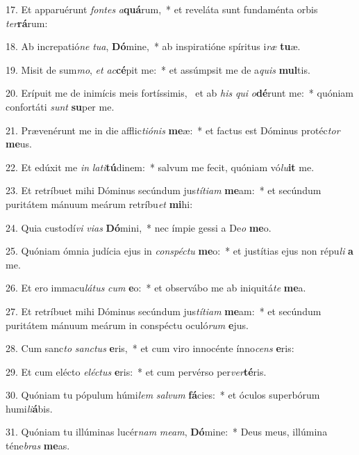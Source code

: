 17. Et apparuérunt \textit{fon}\textit{tes} \textit{a}\textbf{quá}rum,~*  et reveláta sunt fundaménta orbis \textit{ter}\textbf{rá}rum:\

18. Ab increpatió\textit{ne} \textit{tu}\textit{a}, \textbf{Dó}mine,~*  ab inspiratióne spíritus i\textit{ræ} \textbf{tu}æ.\

19. Misit de sum\textit{mo}, \textit{et} \textit{ac}\textbf{cé}pit me:~*  et assúmpsit me de a\textit{quis} \textbf{mul}tis.\

20. Erípuit me de inimícis meis fortíssimis, \dag\  et ab \textit{his} \textit{qui} \textit{o}\textbf{dé}runt me:~*  quóniam confortáti \textit{sunt} \textbf{su}per me.\

21. Prævenérunt me in die afflic\textit{ti}\textit{ó}\textit{nis} \textbf{me}æ:~*  et factus est Dóminus protéc\textit{tor} \textbf{me}us.\

22. Et edúxit me \textit{in} \textit{la}\textit{ti}\textbf{tú}dinem:~*  salvum me fecit, quóniam vó\textit{lu}\textbf{it} me.\

23. Et retríbuet mihi Dóminus secúndum jus\textit{tí}\textit{ti}\textit{am} \textbf{me}am:~*  et secúndum puritátem mánuum meárum retríbu\textit{et} \textbf{mi}hi:\

24. Quia custodí\textit{vi} \textit{vi}\textit{as} \textbf{Dó}mini,~*  nec ímpie gessi a De\textit{o} \textbf{me}o.\

25. Quóniam ómnia judícia ejus in \textit{con}\textit{spéc}\textit{tu} \textbf{me}o:~*  et justítias ejus non répu\textit{li} \textbf{a} me.\

26. Et ero immacu\textit{lá}\textit{tus} \textit{cum} \textbf{e}o:~*  et observábo me ab iniquitá\textit{te} \textbf{me}a.\

27. Et retríbuet mihi Dóminus secúndum jus\textit{tí}\textit{ti}\textit{am} \textbf{me}am:~*  et secúndum puritátem mánuum meárum in conspéctu oculó\textit{rum} \textbf{e}jus.\

28. Cum sanc\textit{to} \textit{sanc}\textit{tus} \textbf{e}ris,~*  et cum viro innocénte ínno\textit{cens} \textbf{e}ris:\

29. Et cum elécto \textit{e}\textit{léc}\textit{tus} \textbf{e}ris:~*  et cum pervérso per\textit{ver}\textbf{té}ris.\

30. Quóniam tu pópulum húmi\textit{lem} \textit{sal}\textit{vum} \textbf{fá}cies:~*  et óculos superbórum humi\textit{li}\textbf{á}bis.\

31. Quóniam tu illúminas lucér\textit{nam} \textit{me}\textit{am}, \textbf{Dó}mine:~*  Deus meus, illúmina téne\textit{bras} \textbf{me}as.\

